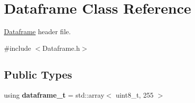 \hypertarget{classDataframe}{}\section{Dataframe Class Reference}
\label{classDataframe}


\hyperlink{classDataframe}{Dataframe} header file.  




{\ttfamily \#include $<$Dataframe.\+h$>$}

\subsection*{Public Types}
\begin{DoxyCompactItemize}
\item 
using {\bfseries dataframe\+\_\+t} = std\+::array$<$ uint8\+\_\+t, 255 $>$\hypertarget{classDataframe_ae8b44f2b26f8d1f9de02e3e3553ae0f8}{}\label{classDataframe_ae8b44f2b26f8d1f9de02e3e3553ae0f8}

\end{DoxyCompactItemize}
